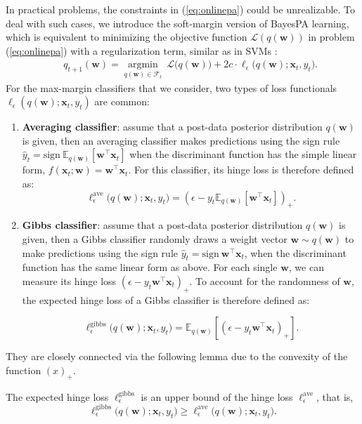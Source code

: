\documentclass[twoside,11pt]{article}
\newcommand{\xv}{\bm{x}}
\newcommand{\wv}{\bm{w}}
\begin{document}
In practical problems, the constraints in (\ref{eq:onlinepa}) could be unrealizable. To deal with such cases, we introduce the soft-margin version of BayesPA learning, which is equivalent to minimizing the objective function $\mathcal{L}(q(\bm{w}))$ in problem (\ref{eq:onlinepa}) with a regularization term, similar as in SVMs \citep{cortes1995support}:
\setlength\arraycolsep{-3pt}\begin{eqnarray}\label{eq:onlinepa_reg}
&&q_{t+1}(\bm{w}) = \underset{q(\bm{w}) \in \mathcal{F}_t}{\operatorname{argmin}} ~\mathcal{L}\Big(q(\bm{w})\Big) + 2c \cdot \ell_\epsilon\Big(q(\bm{w}); \bm{x}_t, y_t\Big).
\end{eqnarray}
%
For the max-margin classifiers that we consider, two types of loss functionals $\ell_\epsilon(q(\bm{w}); \bm{x}_t, y_t)$ are common:
\begin{enumerate}
\item {\bf Averaging classifier}: assume that a post-data posterior distribution $q(\wv)$ is given, then an averaging classifier makes predictions using the sign rule $\hat{y}_t = \textrm{sign} ~ \mathbb{E}_{q(\bm{w})}[\bm{w}^\top \bm{x}_t]$ when the discriminant function has the simple linear form, $f(\xv_t; \wv) = \wv^\top \xv_t$. For this classifier, its hinge loss is therefore defined as:
\setlength\arraycolsep{1pt}\begin{equation*}
\ell_\epsilon^\text{ave}\Big(q(\bm{w}); \bm{x}_t, y_t\Big) = \left(\epsilon-y_t \mathbb{E}_{q(\bm{w})}\left[\bm{w}^\top \bm{x}_t\right]\right)_+ .
\end{equation*}
\item {\bf Gibbs classifier}: assume that a post-data posterior distribution $q(\wv)$ is given, then a Gibbs classifier randomly draws a weight vector $\bm{w} \sim q(\bm{w})$ to make predictions using the sign rule $\hat{y}_t = \textrm{sign}~\bm{w}^\top \bm{x}_t$, when the discriminant function has the same linear form as above. For each single $\wv$, we can measure its hinge loss $(\epsilon-y_t \bm{w}^\top \bm{x}_t )_+$. To account for the randomness of $\wv$, the expected hinge loss of a Gibbs classifier is therefore defined as:

\begin{equation*}
\ell_\epsilon^{\text{gibbs}}\Big(q(\bm{w}); \bm{x}_t, y_t\Big) = \mathbb{E}_{q(\bm{w})}\left[ \left( \epsilon-y_t \bm{w}^\top \bm{x}_t \right)_+\right].
\end{equation*}
\end{enumerate}
They are closely connected via the following lemma due to the convexity of the function $(x)_+$.
\begin{lemma}\label{lm:loss}
The expected hinge loss $\ell_\epsilon^{\text{gibbs}}$ is an upper bound of the hinge loss $\ell_\epsilon^{\text{ave}}$, that is, $$\ell_\epsilon^{\text{gibbs}}\Big(q(\bm{w}); \bm{x}_t, y_t\Big) \geq \ell_\epsilon^{\text{ave}}\Big(q(\bm{w}); \bm{x}_t, y_t\Big).$$
\end{lemma}
\end{document}
